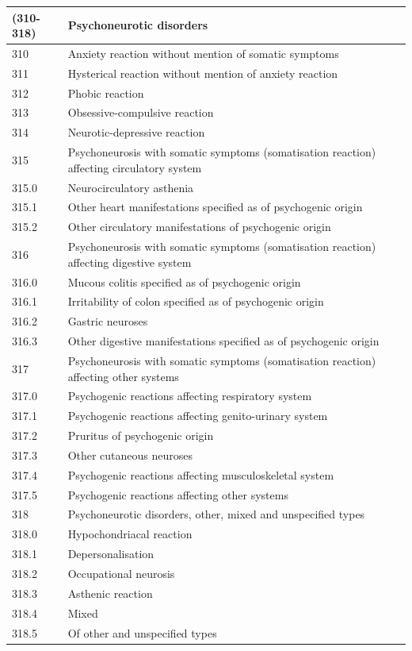 \begin{longtable}[!t]{ | p{2cm} | p{11.8cm} | }
\textbf{(310-318)}&\textbf{Psychoneurotic disorders} \\ \hline
310&Anxiety reaction without mention of somatic symptoms\\
311&Hysterical reaction without mention of anxiety reaction\\
312&Phobic reaction\\
313&Obsessive-compulsive reaction\\
314&Neurotic-depressive reaction\\
315&Psychoneurosis with somatic symptoms (somatisation reaction) affecting circulatory system\\
315.0& Neurocirculatory asthenia\\
315.1& Other heart manifestations specified as of psychogenic origin\\
315.2& Other circulatory manifestations of psychogenic origin\\
316&Psychoneurosis with somatic symptoms (somatisation reaction) affecting digestive system\\
316.0& Mucous colitis specified as of psychogenic origin\\
316.1& Irritability of colon specified as of psychogenic origin\\
316.2& Gastric neuroses\\
316.3& Other digestive manifestations specified as of psychogenic origin\\
317&Psychoneurosis with somatic symptoms (somatisation reaction) affecting other systems\\
317.0& Psychogenic reactions affecting respiratory system\\
317.1& Psychogenic reactions affecting genito-urinary system\\
317.2& Pruritus of psychogenic origin\\
317.3& Other cutaneous neuroses\\
317.4& Psychogenic reactions affecting musculoskeletal system\\
317.5& Psychogenic reactions affecting other systems\\
318&Psychoneurotic disorders, other, mixed and unspecified types\\
318.0& Hypochondriacal reaction\\
318.1& Depersonalisation\\
318.2& Occupational neurosis\\
318.3& Asthenic reaction\\
318.4& Mixed\\
318.5& Of other and unspecified types\\ \hline

\end{longtable}
